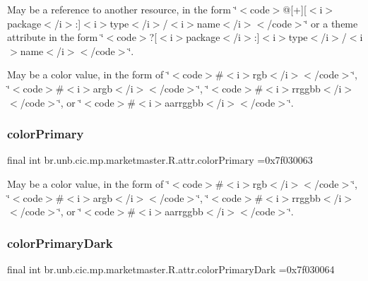 May be a reference to another resource, in the form \char`\"{}$<$code$>$@\mbox{[}+\mbox{]}\mbox{[}$<$i$>$package$<$/i$>$\+:\mbox{]}$<$i$>$type$<$/i$>$/$<$i$>$name$<$/i$>$$<$/code$>$\char`\"{} or a theme attribute in the form \char`\"{}$<$code$>$?\mbox{[}$<$i$>$package$<$/i$>$\+:\mbox{]}$<$i$>$type$<$/i$>$/$<$i$>$name$<$/i$>$$<$/code$>$\char`\"{}. 

May be a color value, in the form of \char`\"{}$<$code$>$\#$<$i$>$rgb$<$/i$>$$<$/code$>$\char`\"{}, \char`\"{}$<$code$>$\#$<$i$>$argb$<$/i$>$$<$/code$>$\char`\"{}, \char`\"{}$<$code$>$\#$<$i$>$rrggbb$<$/i$>$$<$/code$>$\char`\"{}, or \char`\"{}$<$code$>$\#$<$i$>$aarrggbb$<$/i$>$$<$/code$>$\char`\"{}. \mbox{\label{classbr_1_1unb_1_1cic_1_1mp_1_1marketmaster_1_1R_1_1attr_a4636d075cb013c7a73cb3a17e565aca3}} 
\subsubsection{\texorpdfstring{color\+Primary}{colorPrimary}}
{\footnotesize\ttfamily final int br.\+unb.\+cic.\+mp.\+marketmaster.\+R.\+attr.\+color\+Primary =0x7f030063\hspace{0.3cm}{\ttfamily [static]}}

May be a color value, in the form of \char`\"{}$<$code$>$\#$<$i$>$rgb$<$/i$>$$<$/code$>$\char`\"{}, \char`\"{}$<$code$>$\#$<$i$>$argb$<$/i$>$$<$/code$>$\char`\"{}, \char`\"{}$<$code$>$\#$<$i$>$rrggbb$<$/i$>$$<$/code$>$\char`\"{}, or \char`\"{}$<$code$>$\#$<$i$>$aarrggbb$<$/i$>$$<$/code$>$\char`\"{}. \mbox{\label{classbr_1_1unb_1_1cic_1_1mp_1_1marketmaster_1_1R_1_1attr_a6d01a5bce7bfdb11d29fe8a72ef8d547}} 
\subsubsection{\texorpdfstring{color\+Primary\+Dark}{colorPrimaryDark}}
{\footnotesize\ttfamily final int br.\+unb.\+cic.\+mp.\+marketmaster.\+R.\+attr.\+color\+Primary\+Dark =0x7f030064\hspace{0.3cm}{\ttfamily [static]}}

